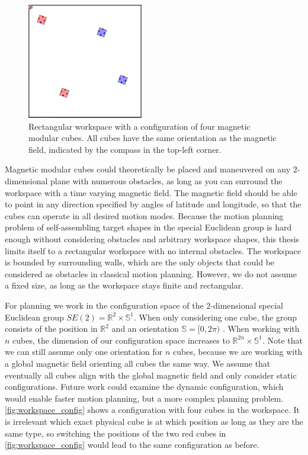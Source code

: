 \begin{figure}
	\centering
	\includegraphics[width=0.45\textwidth]{figures/workspace_config.png}
	\caption[Workspace with a configuration of four magnetic modular cubes]{Rectangular workspace with a configuration of four magnetic modular cubes. All cubes have the same orientation as the magnetic field, indicated by the compass in the top-left corner.}
	\label{fig:workspace_config}
\end{figure}

Magnetic modular cubes could theoretically be placed and maneuvered on any 2-dimensional plane with numerous obstacles, as long as you can surround the workspace with a time varying magnetic field.
The magnetic field should be able to point in any direction specified by angles of latitude and longitude, so that the cubes can operate in all desired motion modes.
Because the motion planning problem of self-assembling target shapes in the special Euclidean group is hard enough without considering obstacles and arbitrary workspace shapes, this thesis limits itself to a rectangular workspace with no internal obstacles.
The workspace is bounded by surrounding walls, which are the only objects that could be considered as obstacles in classical motion planning.
However, we do not assume a fixed size, as long as the workspace stays finite and rectangular.

For planning we work in the configuration space of the 2-dimensional special Euclidean group $SE(2) = \mathbb{R}^2 \times \mathbb{S}^1$.
When only considering one cube, the group consists of the position in $\mathbb{R}^2$ and an orientation $\mathbb{S} = [0,2\pi)$ \cite{LaValle2006}.
When working with $n$ cubes, the dimension of our configuration space increases to $\mathbb{R}^{2n} \times \mathbb{S}^1$.
Note that we can still assume only one orientation for $n$ cubes, because we are working with a global magnetic field orienting all cubes the same way.
We assume that eventually all cubes align with the global magnetic field and only consider static configurations.
Future work could examine the dynamic configuration, which would enable faster motion planning, but a more complex planning problem.
\autoref{fig:workspace_config} shows a configuration with four cubes in the workspace.
It is irrelevant which exact physical cube is at which position as long as they are the same type, so switching the positions of the two red cubes in \autoref{fig:workspace_config} would lead to the same configuration as before.


